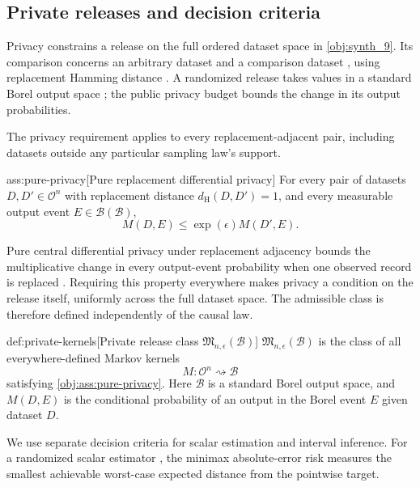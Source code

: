 \subsection{Private releases and decision criteria}

Privacy constrains a release on the full ordered dataset space in \cref{obj:synth_9}. Its comparison concerns an arbitrary dataset and a comparison dataset , using replacement Hamming distance . A randomized release  takes values in a standard Borel output space ; the public privacy budget  bounds the change in its output probabilities.



The privacy requirement applies to every replacement-adjacent pair, including datasets outside any particular sampling law's support.

\begin{assumptionv}{ass:pure-privacy}[Pure replacement differential privacy]
For every pair of datasets \(D,D'\in\mathcal O^n\) with replacement distance \(d_{\mathrm H}(D,D')=1\), and every measurable output event \(E\in\mathcal B(\mathcal B)\),
\[
M(D,E)\le \exp(\epsilon)M(D',E).
\]
\end{assumptionv}

Pure central differential privacy under replacement adjacency bounds the multiplicative change in every output-event probability when one observed record is replaced \citep{AcharyaSunZhang2021}. Requiring this property everywhere makes privacy a condition on the release itself, uniformly across the full dataset space. The admissible class is therefore defined independently of the causal law.

\begin{definitionv}{def:private-kernels}[Private release class \(\mathfrak M_{n,\epsilon}(\mathcal B)\)]
\(\mathfrak M_{n,\epsilon}(\mathcal B)\) is the class of all everywhere-defined Markov kernels
\[
M:\mathcal O^n\rightsquigarrow\mathcal B
\]
satisfying \cref{obj:ass:pure-privacy}. Here \(\mathcal B\) is a standard Borel output space, and \(M(D,E)\) is the conditional probability of an output in the Borel event \(E\) given dataset \(D\).
\end{definitionv}

We use separate decision criteria for scalar estimation and interval inference. For a randomized scalar estimator , the minimax absolute-error risk  measures the smallest achievable worst-case expected distance from the pointwise target.

